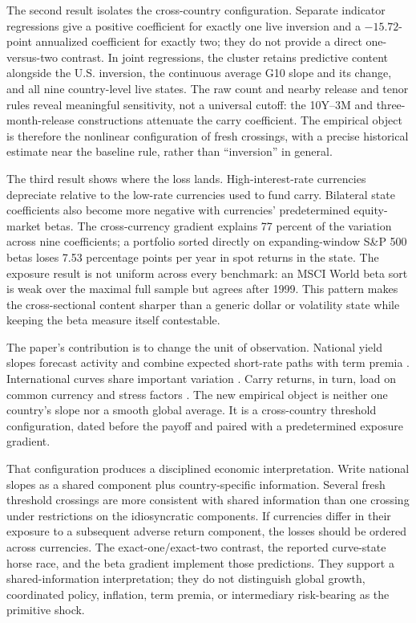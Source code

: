 The second result isolates the cross-country configuration. Separate indicator regressions give a positive coefficient for exactly one live inversion and a $-15.72$-point annualized coefficient for exactly two; they do not provide a direct one-versus-two contrast. In joint regressions, the cluster retains predictive content alongside the U.S. inversion, the continuous average G10 slope and its change, and all nine country-level live states. The raw count and nearby release and tenor rules reveal meaningful sensitivity, not a universal cutoff: the 10Y--3M and three-month-release constructions attenuate the carry coefficient. The empirical object is therefore the nonlinear configuration of fresh crossings, with a precise historical estimate near the baseline rule, rather than “inversion” in general.

The third result shows where the loss lands. High-interest-rate currencies depreciate relative to the low-rate currencies used to fund carry. Bilateral state coefficients also become more negative with currencies' predetermined equity-market betas. The cross-currency gradient explains 77 percent of the variation across nine coefficients; a portfolio sorted directly on expanding-window S\&P 500 betas loses 7.53 percentage points per year in spot returns in the state. The exposure result is not uniform across every benchmark: an MSCI World beta sort is weak over the maximal full sample but agrees after 1999. This pattern makes the cross-sectional content sharper than a generic dollar or volatility state while keeping the beta measure itself contestable.

The paper's contribution is to change the unit of observation. National yield slopes forecast activity and combine expected short-rate paths with term premia \citep{harvey1988,estrellaHardouvelis1991,estrellaMishkin1998,campbellShiller1991,hamiltonKim2002}. International curves share important variation \citep{plosserRouwenhorst1994,bernardGerlach1998,diebold2008,chinnKucko2015}. Carry returns, in turn, load on common currency and stress factors \citep{fama1984,brunnermeier2008,lustig2011,menkhoff2012,farhiGabaix2016}. The new empirical object is neither one country's slope nor a smooth global average. It is a cross-country threshold configuration, dated before the payoff and paired with a predetermined exposure gradient.

That configuration produces a disciplined economic interpretation. Write national slopes as a shared component plus country-specific information. Several fresh threshold crossings are more consistent with shared information than one crossing under restrictions on the idiosyncratic components. If currencies differ in their exposure to a subsequent adverse return component, the losses should be ordered across currencies. The exact-one/exact-two contrast, the reported curve-state horse race, and the beta gradient implement those predictions. They support a shared-information interpretation; they do not distinguish global growth, coordinated policy, inflation, term premia, or intermediary risk-bearing as the primitive shock.

